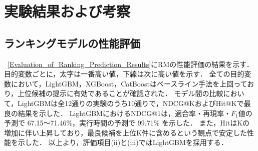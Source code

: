 \section{実験結果および考察} \label{sec5}
\subsection{ランキングモデルの性能評価} \label{sec5.1}
~\ref{Evaluation_of_Ranking_Prediction_Results}にRMの性能評価の結果を示す．
目的変数ごとに，太字は一番高い値，下線は次に高い値を示す．
全ての目的変数において，LightGBM，XGBoost，CatBoostはベースライン手法を上回っており，上位候補の提示に有効であることが確認された．
モデル間の比較において，LightGBMは全12通りの実験のうち10通りで，NDCG@KおよびHit@Kで最良の結果を示した．
LightGBMにおけるNDCG@1は，適合率・再現率・$F_1$値の予測で 67.15～71.46\%，実行時間の予測で 99.71\% を示した．
また，HitはKの増加に伴い上昇しており，最良候補を上位K件に含めるという観点で安定した性能を示した．
以上より，評価項目(ii)と(iii)ではLightGBMを採用する．

